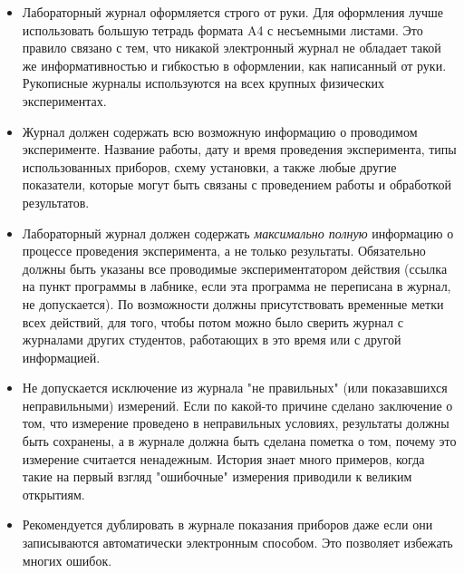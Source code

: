 \begin{itemize}
    \item Лабораторный журнал оформляется строго от руки. Для оформления лучше использовать большую тетрадь формата A4 с несъемными листами. Это правило связано с тем, что никакой электронный журнал не обладает такой же информативностью и гибкостью в оформлении, как написанный от руки. Рукописные журналы используются на всех крупных физических экспериментах.
    
    \item Журнал должен содержать всю возможную информацию о проводимом эксперименте. Название работы, дату и время проведения эксперимента, типы использованных приборов, схему установки, а также любые другие показатели, которые могут быть связаны с проведением работы и обработкой результатов.
    
    
    \item Лабораторный журнал должен содержать \emph{максимально полную} информацию о процессе проведения эксперимента, а не только результаты. Обязательно должны быть указаны все проводимые экспериментатором действия (ссылка на пункт программы в лабнике, если эта программа не переписана в журнал, не допускается). По возможности должны присутствовать временные метки всех действий, для того, чтобы потом можно было сверить журнал с журналами других студентов, работающих в это время или с другой информацией.
    
    
    \item Не допускается исключение из журнала "не правильных" (или показавшихся неправильными) измерений. Если по какой-то причине сделано заключение о том, что измерение проведено в неправильных условиях, результаты должны быть сохранены, а в журнале должна быть сделана пометка о том, почему это измерение считается ненадежным. История знает много примеров, когда такие на первый взгляд "ошибочные" измерения приводили к великим открытиям.

    \item Рекомендуется дублировать в журнале показания приборов даже если они записываются автоматически электронным способом. Это позволяет избежать многих ошибок.
    
\end{itemize}

